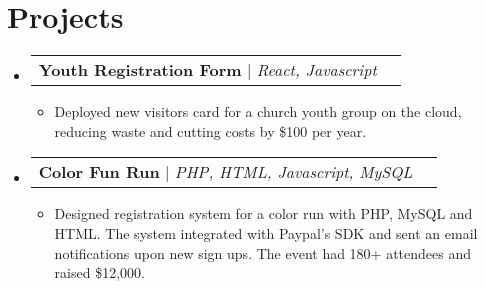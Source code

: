 \documentclass[letterpaper,11pt]{article}
\makeatletter
\newcommand{\resumeItem}[1]{
  \item\small{
    {#1 \vspace{-2pt}}
  }
}
\newcommand{\resumeProjectHeading}[2]{
    \item
    \begin{tabular*}{0.97\textwidth}{l@{\extracolsep{\fill}}r}
      \small#1 & #2 \\
    \end{tabular*}\vspace{-7pt}
}
\newcommand{\resumeSubHeadingListStart}{\begin{itemize}[leftmargin=0.0in, label={}]}
\newcommand{\resumeSubHeadingListEnd}{\end{itemize}}
\newcommand{\resumeItemListStart}{\begin{itemize}}
\newcommand{\resumeItemListEnd}{\end{itemize}\vspace{-10pt}}
\makeatother
\begin{document}
\section{Projects}
    \resumeSubHeadingListStart
        \resumeProjectHeading
          {\textbf{Youth Registration Form} $|$ \emph{React, Javascript}}{}
          \resumeItemListStart[leftmargin=0.15in]
            \resumeItem{Deployed new visitors card for a church youth group on the cloud, reducing waste and cutting costs by \$100 per year.}
          \resumeItemListEnd
        \resumeProjectHeading
          {\textbf{Color Fun Run} $|$ \emph{PHP, HTML, Javascript, MySQL}}{}
          \resumeItemListStart[leftmargin=0.15in]
            \resumeItem{Designed registration system for a color run with PHP, MySQL and HTML. The system integrated with Paypal's SDK and sent an email notifications upon new sign ups. The event had 180+ attendees and raised \$12,000.}
          \resumeItemListEnd  

        
    \resumeSubHeadingListEnd
\end{document}
